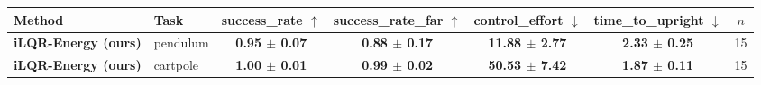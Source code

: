 \begin{tabular}{llccccc}
\toprule
Method & Task & success\_rate $\uparrow$ & success\_rate\_far $\uparrow$ & control\_effort $\downarrow$ & time\_to\_upright $\downarrow$ & $n$ \\
\midrule
\textbf{iLQR-Energy (ours)} & pendulum & \textbf{0.95 $\pm$ 0.07} & \textbf{0.88 $\pm$ 0.17} & \textbf{11.88 $\pm$ 2.77} & \textbf{2.33 $\pm$ 0.25} & 15 \\
\midrule
\textbf{iLQR-Energy (ours)} & cartpole & \textbf{1.00 $\pm$ 0.01} & \textbf{0.99 $\pm$ 0.02} & \textbf{50.53 $\pm$ 7.42} & \textbf{1.87 $\pm$ 0.11} & 15 \\
\bottomrule
\end{tabular}
